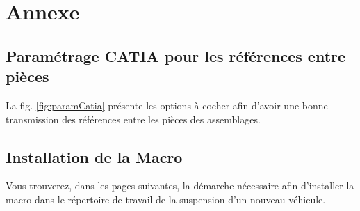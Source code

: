 \section{Annexe}


\subsection{Paramétrage CATIA pour les références entre pièces} %

\par La fig. \ref{fig:paramCatia} présente les options à cocher afin d'avoir une bonne transmission des références entre les pièces des assemblages.


\subsection{Installation de la Macro}
\label{install_macro}

\par Vous trouverez, dans les pages suivantes, la démarche nécessaire afin d'installer la macro dans le répertoire de travail de la suspension d'un nouveau véhicule.









